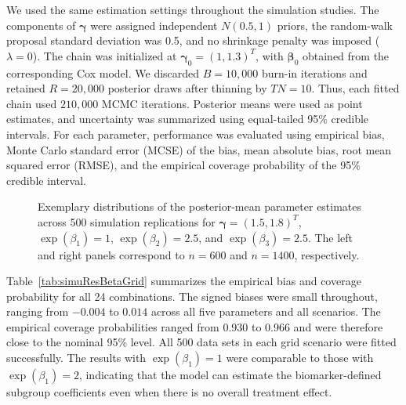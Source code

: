 We used the same estimation settings throughout the simulation studies. The components of $\boldsymbol\gamma$ were assigned independent $N(0.5,1)$ priors, the random-walk proposal standard deviation was 0.5, and no shrinkage penalty was imposed ($\lambda=0$). The chain was initialized at $\boldsymbol\gamma_0=(1,1.3)^{T}$, with $\boldsymbol\beta_0$ obtained from the corresponding Cox model. We discarded $B=10{,}000$ burn-in iterations and retained $R=20{,}000$ posterior draws after thinning by $TN=10$. Thus, each fitted chain used $210{,}000$ MCMC iterations. Posterior means were used as point estimates, and uncertainty was summarized using equal-tailed 95\% credible intervals. For each parameter, performance was evaluated using empirical bias, Monte Carlo standard error (MCSE) of the bias, mean absolute bias, root mean squared error (RMSE), and the empirical coverage probability of the 95\% credible interval.

\begin{figure}[!htbp]
    \centering
    \caption[Exemplary distributions of the parameter estimates across simulation replications]{Exemplary distributions of the posterior-mean parameter estimates across 500 simulation replications for $\boldsymbol\gamma=(1.5,1.8)^{T}$, $\exp(\beta_1)=1$, $\exp(\beta_2)=2.5$, and $\exp(\beta_3)=2.5$. The left and right panels correspond to $n=600$ and $n=1400$, respectively.}
    \label{fig:simuEstimateHist}
\end{figure}

Table~\ref{tab:simuResBetaGrid} summarizes the empirical bias and coverage probability for all 24 combinations. The signed biases were small throughout, ranging from $-0.004$ to $0.014$ across all five parameters and all scenarios. The empirical coverage probabilities ranged from 0.930 to 0.966 and were therefore close to the nominal 95\% level. All 500 data sets in each grid scenario were fitted successfully. The results with $\exp(\beta_1)=1$ were comparable to those with $\exp(\beta_1)=2$, indicating that the model can estimate the biomarker-defined subgroup coefficients even when there is no overall treatment effect.

